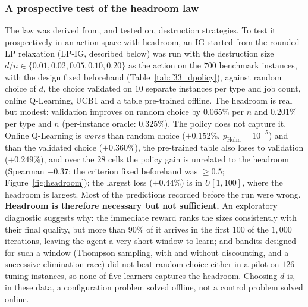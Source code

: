 

\subsubsection*{A prospective test of the headroom law}
The law was derived from, and tested on, destruction strategies. To test it prospectively in an action space with headroom, an IG started from the rounded LP relaxation (LP-IG, described below) was run with the
destruction size $d/n\in\{0.01,0.02,0.05,0.10,0.20\}$ as the action on the $700$ benchmark instances, with the design fixed beforehand (Table~\ref{tab:f33_dpolicy}), against random choice of $d$, the choice validated on $10$ separate instances
per type and job count, online Q-Learning, UCB1 and a table pre-trained offline. The headroom is real but modest: validation improves on random choice by $0.065\%$ per $n$ and $0.201\%$ per type and $n$ (per-instance
oracle: $0.325\%$). The policy does not capture it. Online Q-Learning is \emph{worse} than random choice ($+0.152\%$, $p_{\mathrm{Holm}}=10^{-5}$) and than the validated choice ($+0.360\%$), the pre-trained table also loses to validation ($+0.249\%$),
and over the $28$ cells the policy gain is unrelated to the headroom (Spearman $-0.37$; the criterion fixed beforehand was $\geq0.5$; Figure~\ref{fig:headroom}); the largest loss ($+0.44\%$) is in $U[1,100]$, where the headroom is largest. Most of the predictions
recorded before the run were wrong. \textbf{Headroom is therefore necessary but not sufficient.} An exploratory diagnostic suggests why: the immediate reward ranks the sizes consistently with their final quality, but more than $90\%$ of it arrives in
the first $100$ of the $1{,}000$ iterations, leaving the agent a very short window to learn; and bandits designed for such a window (Thompson sampling, with and without discounting, and a successive-elimination race) did not beat random choice either in a
pilot on $126$ tuning instances, so none of five learners captures the headroom. Choosing $d$ is, in these data, a configuration problem solved offline, not a control problem solved online.

